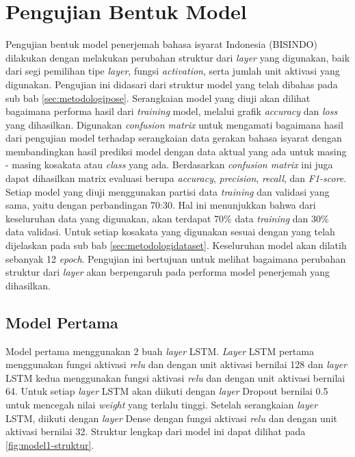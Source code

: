 \section{Pengujian Bentuk Model}
\label{sec:analisismodel}

Pengujian bentuk model penerjemah bahasa isyarat Indonesia (BISINDO) dilakukan dengan melakukan perubahan struktur dari \emph{layer} yang digunakan, baik dari segi pemilihan tipe \emph{layer}, fungsi \emph{activation}, serta jumlah unit aktivasi yang digunakan. Pengujian ini didasari dari struktur model yang telah dibahas pada sub bab \ref{sec:metodologipose}. Serangkaian model yang diuji akan dilihat bagaimana performa hasil dari \emph{training} model, melalui grafik \emph{accuracy} dan \emph{loss} yang dihasilkan. Digunakan \emph{confusion matrix} untuk mengamati bagaimana hasil dari pengujian model terhadap serangkaian data gerakan bahasa isyarat dengan membandingkan hasil prediksi model dengan data aktual yang ada untuk masing - masing kosakata atau \emph{class} yang ada. Berdasarkan \emph{confusion matrix} ini juga dapat dihasilkan matrix evaluasi berupa \emph{accuracy}, \emph{precision}, \emph{recall}, dan \emph{F1-score}. Setiap model yang diuji menggunakan partisi data \emph{training} dan validasi yang sama, yaitu dengan perbandingan 70:30. Hal ini menunjukkan bahwa dari keseluruhan data yang digunakan, akan terdapat 70\% data \emph{training} dan 30\% data validasi. Untuk setiap kosakata yang digunakan sesuai dengan yang telah dijelaskan pada sub bab \ref{sec:metodologidataset}. Keseluruhan model akan dilatih sebanyak 12 \emph{epoch}. Pengujian ini bertujuan untuk melihat bagaimana perubahan struktur dari \emph{layer} akan berpengaruh pada performa model penerjemah yang dihasilkan.

\subsection{Model Pertama}
\label{sec:analisismodel1}
Model pertama menggunakan 2 buah \emph{layer} LSTM. \emph{Layer} LSTM pertama menggunakan fungsi aktivasi \emph{relu} dan dengan unit aktivasi bernilai 128 dan \emph{layer} LSTM kedua menggunakan fungsi aktivasi \emph{relu} dan dengan unit aktivasi bernilai 64. Untuk setiap \emph{layer} LSTM akan diikuti dengan \emph{layer} Dropout bernilai 0.5 untuk mencegah nilai \emph{weight} yang terlalu tinggi. Setelah serangkaian \emph{layer} LSTM, diikuti dengan \emph{layer} Dense dengan fungsi aktivasi \emph{relu} dan dengan unit aktivasi bernilai 32. Struktur lengkap dari model ini dapat dilihat pada \ref{fig:model1-struktur}.

